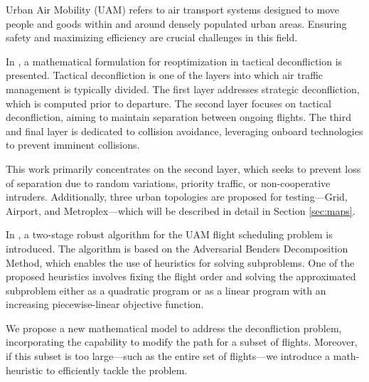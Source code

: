 \documentclass[../../thesis.tex]{subfiles}
\begin{document}
Urban Air Mobility (UAM) refers to air transport systems designed to move people and goods within and around densely populated urban areas. Ensuring safety and maximizing efficiency are crucial challenges in this field.  

In \cite{pelegrin-2023}, a mathematical formulation for reoptimization in tactical deconfliction is presented. Tactical deconfliction is one of the layers into which air traffic management is typically divided. The first layer addresses strategic deconfliction, which is computed prior to departure. The second layer focuses on tactical deconfliction, aiming to maintain separation between ongoing flights. The third and final layer is dedicated to collision avoidance, leveraging onboard technologies to prevent imminent collisions.

This work primarily concentrates on the second layer, which seeks to prevent loss of separation due to random variations, priority traffic, or non-cooperative intruders. Additionally, three urban topologies are proposed for testing—Grid, Airport, and Metroplex—which will be described in detail in Section \ref{sec:maps}.  

In \cite{portoleau-2024}, a two-stage robust algorithm for the UAM flight scheduling problem is introduced. The algorithm is based on the Adversarial Benders Decomposition Method, which enables the use of heuristics for solving subproblems. One of the proposed heuristics involves fixing the flight order and solving the approximated subproblem either as a quadratic program or as a linear program with an increasing piecewise-linear objective function.  

We propose a new mathematical model to address the deconfliction problem, incorporating the capability to modify the path for a subset of flights. Moreover, if this subset is too large—such as the entire set of flights—we introduce a math-heuristic to efficiently tackle the problem.  
\end{document}

